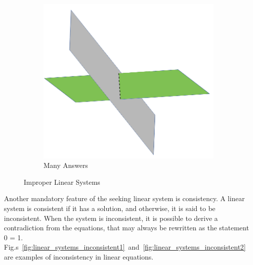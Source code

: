 \documentclass[10pt, journal, letterpaper]{IEEEtran}
\begin{document}
\begin{figure}
\begin{subfigure}{0.49\columnwidth}
          \includegraphics[width=\columnwidth]{img/Many_answer.png}
          \caption{Many Answers}
          \label{fig:linear_systems_many_answers}
    \end{subfigure}
    \caption{Improper Linear Systems}
    \label{fig:linear_systems}
\end{figure}
Another mandatory feature of the seeking linear system is consistency. A linear system is consistent if it has a solution, and otherwise, it is said to be inconsistent. When the system is inconsistent, it is possible to derive a contradiction from the equations, that may always be rewritten as the statement 0 = 1. Fig.s~\ref{fig:linear_systems_inconsistent1}~and~\ref{fig:linear_systems_inconsistent2} are examples of inconsistency in linear equations. 
\end{document}

